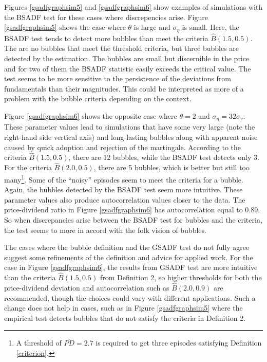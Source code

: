 \documentclass[12pt]{article}
\begin{document}
Figures \ref{gsadfgraphsim5} and \ref{gsadfgraphsim6} show examples of simulations with the BSADF test for these cases where discrepencies arise. Figure \ref{gsadfgraphsim5} shows the case where $\theta$ is large and $\sigma_{\eta}$ is small. Here, the BSADF test tends to detect more bubbles than meet the criteria $\widehat{B}(1.5,0.5)$. The are no bubbles that meet the threshold criteria, but three bubbles are detected by the estimation. The bubbles are small but discernible in the price and for two of them the BSADF statistic easily exceeds the critical value. The test seems to be more sensitive to the persistence of the deviations from fundamentals than their magnitudes. This could be interpreted as more of a problem with the bubble criteria depending on the context.

Figure \ref{gsadfgraphsim6} shows the opposite case where $\theta=2$ and $\sigma_{\eta}=32\sigma_{v}$. These parameter values lead to simulations that have some very large (note the right-hand side vertical axis) and long-lasting bubbles along with apparent noise caused by quick adoption and rejection of the martingale. According to the criteria $\widehat{B}(1.5,0.5)$, there are 12 bubbles, while the BSADF test detects only 3. For the criteria $\widehat{B}(2.0,0.5)$, there are 5 bubbles, which is better but still too many\footnote{A threshold of $\overline{PD}=2.7$ is required to get three episodes satisfying Definition \ref{criterion}.}. Some of the ``noisy'' episodes seem to meet the criteria for a bubble. Again, the bubbles detected by the BSADF test seem more intuitive. These parameter values also produce autocorrelation values closer to the data. The price-dividend ratio in Figure \ref{gsadfgraphsim6} has autocorrelation equal to 0.89. So when discrepancies arise between the BSADF test for bubbles and the criteria, the test seems to more in accord with the folk vision of bubbles. 

The cases where the bubble definition and the GSADF test do not fully agree suggest some refinements of the definition and advice for applied work. For the case in Figure \ref{gsadfgraphsim6}, the results from GSADF test are more intuitive than the criteria $\widehat{B}(1.5,0.5)$ from Definition 2, so higher thresholds for both the price-dividend deviation and autocorrelation such as $\widehat{B}(2.0,0.9)$ are recommended, though the choices could vary with different applications. Such a change does not help in cases, such as in Figure \ref{gsadfgraphsim5} where the empirical test detects bubbles that do not satisfy the criteria in Definition 2. 
\end{document}
